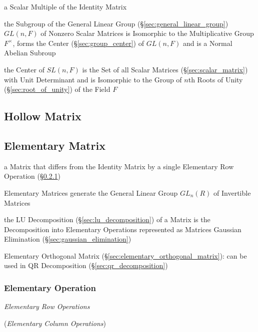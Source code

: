 a Scalar Multiple of the Identity Matrix

the Subgroup of the General Linear Group (\S\ref{sec:general_linear_group})
$GL(n,F)$ of Nonzero Scalar Matrices is Isomorphic to the Multiplicative Group
$F^\times$, forms the Center (\S\ref{sec:group_center}) of $GL(n,F)$ and is a
Normal Abelian Subroup

the Center of $SL(n,F)$ is the Set of all Scalar Matrices
(\S\ref{sec:scalar_matrix}) with Unit Determinant and is Isomorphic to the
Group of $n$th Roots of Unity (\S\ref{sec:root_of_unity}) of the Field $F$



\subsection{Hollow Matrix}\label{sec:hollow_matrix}

\subsection{Elementary Matrix}\label{sec:elementary_matrix}

a Matrix that differs from the Identity Matrix by a single Elementary Row
Operation (\S\ref{sec:elementary_operation})

Elementary Matrices generate the General Linear Group $GL_n(R)$ of Invertible
Matrices

the LU Decomposition (\S\ref{sec:lu_decomposition}) of a Matrix is the
Decomposition into Elementary Operations represented as Matrices \fist Gaussian
Elimination (\S\ref{sec:gaussian_elimination})

Elementary Orthogonal Matrix (\S\ref{sec:elementary_orthogonal_matrix}): can be
used in QR Decomposition (\S\ref{sec:qr_decomposition})



\subsubsection{Elementary Operation}\label{sec:elementary_operation}

\emph{Elementary Row Operations}

(\emph{Elementary Column Operations})

